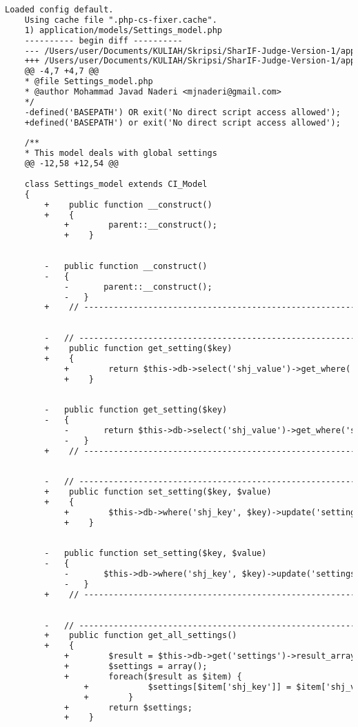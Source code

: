 \begin{lstlisting}[language=diff, caption=Perubahan pada kode Settings\_model.php]
	Loaded config default.
	Using cache file ".php-cs-fixer.cache".
	1) application/models/Settings_model.php
	---------- begin diff ----------
	--- /Users/user/Documents/KULIAH/Skripsi/SharIF-Judge-Version-1/application/models/Settings_model.php
	+++ /Users/user/Documents/KULIAH/Skripsi/SharIF-Judge-Version-1/application/models/Settings_model.php
	@@ -4,7 +4,7 @@
	* @file Settings_model.php
	* @author Mohammad Javad Naderi <mjnaderi@gmail.com>
	*/
	-defined('BASEPATH') OR exit('No direct script access allowed');
	+defined('BASEPATH') or exit('No direct script access allowed');
	
	/**
	* This model deals with global settings
	@@ -12,58 +12,54 @@
	
	class Settings_model extends CI_Model
	{
		+    public function __construct()
		+    {
			+        parent::__construct();
			+    }
		
		
		-	public function __construct()
		-	{
			-		parent::__construct();
			-	}
		+    // ------------------------------------------------------------------------
		
		
		-	// ------------------------------------------------------------------------
		+    public function get_setting($key)
		+    {
			+        return $this->db->select('shj_value')->get_where('settings', array('shj_key' => $key))->row()->shj_value;
			+    }
		
		
		-	public function get_setting($key)
		-	{
			-		return $this->db->select('shj_value')->get_where('settings', array('shj_key'=>$key))->row()->shj_value;
			-	}
		+    // ------------------------------------------------------------------------
		
		
		-	// ------------------------------------------------------------------------
		+    public function set_setting($key, $value)
		+    {
			+        $this->db->where('shj_key', $key)->update('settings', array('shj_value' => $value));
			+    }
		
		
		-	public function set_setting($key, $value)
		-	{
			-		$this->db->where('shj_key', $key)->update('settings', array('shj_value'=>$value));
			-	}
		+    // ------------------------------------------------------------------------
		
		
		-	// ------------------------------------------------------------------------
		+    public function get_all_settings()
		+    {
			+        $result = $this->db->get('settings')->result_array();
			+        $settings = array();
			+        foreach($result as $item) {
				+            $settings[$item['shj_key']] = $item['shj_value'];
				+        }
			+        return $settings;
			+    }
		

\end{lstlisting}
